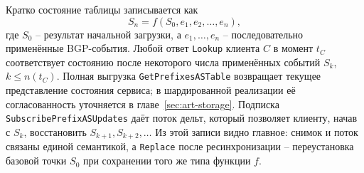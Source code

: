 Кратко состояние таблицы записывается как
\[
S_n = f(S_0, e_1, e_2, \ldots, e_n),
\]
где $S_0$ -- результат начальной загрузки, а $e_1, \ldots, e_n$ --
последовательно применённые BGP-события. Любой ответ \texttt{Lookup}
клиента $C$ в момент $t_C$ соответствует состоянию после некоторого числа
применённых событий $S_k$, $k \le n(t_C)$. Полная выгрузка
\texttt{GetPrefixesASTable} возвращает текущее представление состояния
сервиса; в шардированной реализации её согласованность уточняется в
главе~\ref{sec:art-storage}. Подписка \texttt{SubscribePrefixASUpdates}
даёт поток дельт, который позволяет клиенту, начав с $S_k$, восстановить
$S_{k+1}, S_{k+2}, \ldots$ Из этой записи видно главное: снимок и поток
связаны единой семантикой, а \texttt{Replace} после ресинхронизации --
переустановка базовой точки $S_0$ при сохранении того же типа функции
$f$.

